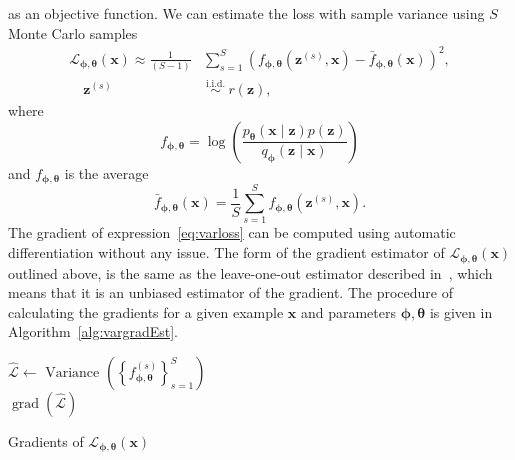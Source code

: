 \documentclass[final,3p,times,twocolumn]{elsarticle}
\begin{document}
as an objective function. We can estimate the loss with sample variance using $S$ Monte Carlo samples
\begin{equation}
	\label{eq:varloss}
	\begin{aligned}
		\mathcal{L}_{\boldsymbol{\phi}, \boldsymbol{\theta}}(\mathbf{x}) \approx \frac{1}{(S-1)} &\sum_{s=1}^{S}\left(f_{\boldsymbol{\phi},\boldsymbol{\theta}}(\mathbf{z}^{(s)}, \mathbf{x})-\bar{f}_{\boldsymbol{\phi},\boldsymbol{\theta}}(\mathbf{x})\right)^{2}, \\
		\quad \mathbf{z}^{(s)} &\stackrel{\text { i.i.d. }}{\sim} r(\mathbf{z}),
	\end{aligned}
\end{equation}
where
\begin{equation}
	f_{\boldsymbol{\phi},\boldsymbol{\theta}} = \log \left(\frac{p_{\boldsymbol{\theta}}(\mathbf{x} \mid \mathbf{z}) p(\mathbf{z})}{q_{\boldsymbol{\phi}}(\mathbf{z} \mid \mathbf{x})}\right)
\end{equation}
and $f_{\boldsymbol{\phi},\boldsymbol{\theta}}$ is the average
\begin{equation}
	\bar{f}_{\boldsymbol{\phi},\boldsymbol{\theta}}(\mathbf{x})=\frac{1}{S} \sum_{s=1}^{S} f_{\boldsymbol{\phi},\boldsymbol{\theta}}\left(\mathbf{z}^{(s)},  \mathbf{x}\right).
\end{equation}
The gradient of expression~\eqref{eq:varloss} can be computed using automatic differentiation without any issue. The form of the gradient estimator of $\mathcal{L}_{\boldsymbol{\phi}, \boldsymbol{\theta}}(\mathbf{x})$ outlined above, is the same as the leave-one-out estimator described in~\cite{richter2020vargrad}, which means that it is an unbiased estimator of the gradient. The procedure of calculating the gradients for a given example $\mathbf{x}$ and parameters $\boldsymbol{\phi}, \boldsymbol{\theta}$ is given in Algorithm~\ref{alg:vargradEst}.
\begin{algorithm}[h]
	\SetAlgoLined
	$\widehat{\mathcal{L}} \leftarrow \text { Variance }\left(\left\{f_{\boldsymbol{\phi}, \boldsymbol{\theta}}^{(s)}\right\}_{s=1}^{S}\right)$ \\
	
	\Return $\operatorname{grad}\left(\widehat{\mathcal{L}}\right)$
	\caption{\label{alg:vargradEst}Gradients of $\mathcal{L}_{\boldsymbol{\boldsymbol{\phi}}, \boldsymbol{\theta}}(\mathbf{x})$}
\end{algorithm}
\end{document}
